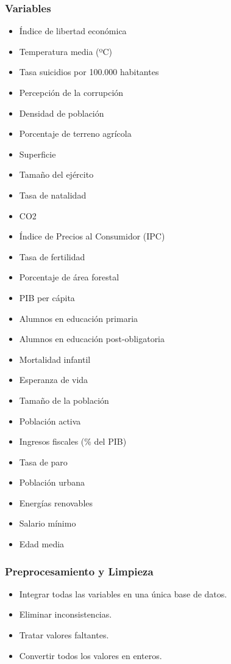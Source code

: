 \documentclass{beamer}
\newcommand{\slideauthor}[1]{\gdef\insertslideauthor{#1}}
\begin{document}
\begin{frame}
\frametitle{Variables}
\slideauthor{Javier Comyn}

\begin{multicols}{2} %
\footnotesize %
\begin{itemize}
    \item Índice de libertad económica
    \item Temperatura media (ºC)
    \item Tasa suicidios por 100.000 habitantes
    \item Percepción de la corrupción
    \item Densidad de población
    \item Porcentaje de terreno agrícola
    \item Superficie
    \item Tamaño del ejército
    \item Tasa de natalidad
    \item CO2
    \item Índice de Precios al Consumidor (IPC)
    \item Tasa de fertilidad
    \item Porcentaje de área forestal
\end{itemize}
\columnbreak %
\begin{itemize}
    \item PIB per cápita
    \item Alumnos en educación primaria
    \item Alumnos en educación post-obligatoria
    \item Mortalidad infantil
    \item Esperanza de vida
    \item Tamaño de la población
    \item Población activa
    \item Ingresos fiscales (\% del PIB)
    \item Tasa de paro
    \item Población urbana
    \item Energías renovables
    \item Salario mínimo
    \item Edad media
\end{itemize}
\end{multicols}
\end{frame}
\begin{frame}
\frametitle{Preprocesamiento y Limpieza}
\slideauthor{Javier Comyn}
\begin{itemize}
    \item Integrar todas las variables en una única base de datos.
    \item Eliminar inconsistencias.
    \item Tratar valores faltantes.
    \item Convertir todos los valores en enteros.
\end{itemize}
\end{frame}
\end{document}
